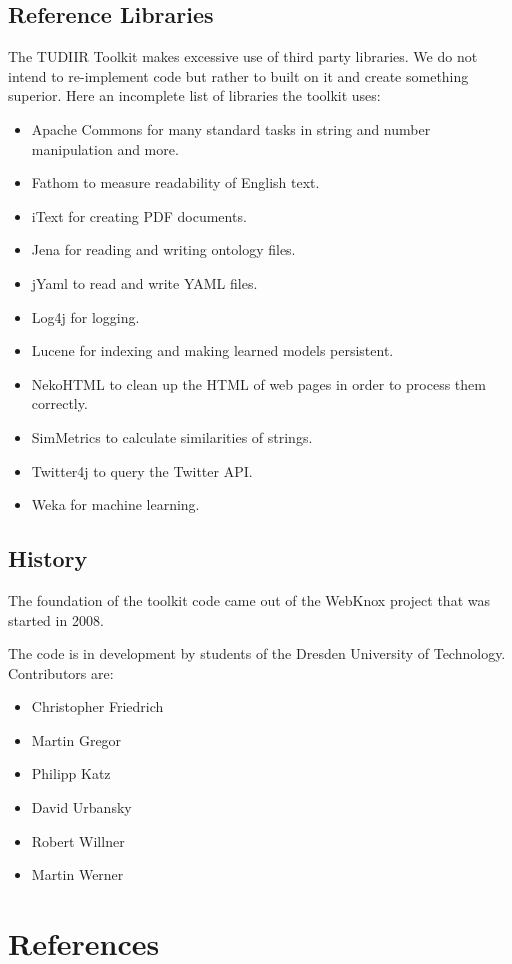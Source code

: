 \documentclass[a4paper,twoside]{book}      %
\begin{document}
\section{Reference Libraries}
The TUDIIR Toolkit makes excessive use of third party libraries. We do not intend to re-implement code but rather to built on it and create something superior. Here an incomplete list of libraries the toolkit uses:
\begin{itemize}
\item Apache Commons \cite{apachecommons} for many standard tasks in string and number manipulation and more.
\item Fathom \cite{fathom} to measure readability of English text.
\item iText \cite{itext} for creating PDF documents.
\item Jena \cite{jena} for reading and writing ontology files.
\item jYaml \cite{jyaml} to read and write YAML files.
\item Log4j \cite{log4j} for logging.
\item Lucene \cite{lucene} for indexing and making learned models persistent.
\item NekoHTML \cite{nekohtml} to clean up the HTML of web pages in order to process them correctly.
\item SimMetrics \cite{simmetrics} to calculate similarities of strings.
\item Twitter4j \cite{twitter4j} to query the Twitter API.
\item Weka \cite{hall2009weka} for machine learning.
\end{itemize}

\section{History}
The foundation of the toolkit code came out of the WebKnox project\cite{webknox} that was started in 2008.%

The code is in development by students of the Dresden University of Technology. Contributors are:
\begin{itemize}
\item Christopher Friedrich
\item Martin Gregor
\item Philipp Katz
\item David Urbansky
\item Robert Willner
\item Martin Werner
\end{itemize}

\chapter{References}


\end{document}
